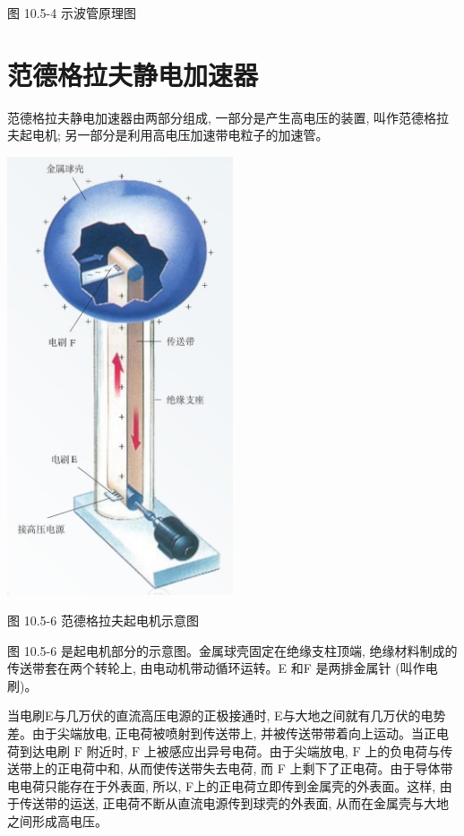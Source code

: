 \documentclass[10pt]{article}
\begin{document}
图 10.5-4 示波管原理图

\section*{范德格拉夫静电加速器}

范德格拉夫静电加速器由两部分组成, 一部分是产生高电压的装置, 叫作范德格拉夫起电机; 另一部分是利用高电压加速带电粒子的加速管。

\begin{center}
\includegraphics[max width=0.5\textwidth]{images/01911d5f-8e38-70c0-b5b8-2b399bd115b6_53_103313.jpg}
\end{center}

图 10.5-6 范德格拉夫起电机示意图

图 10.5-6 是起电机部分的示意图。金属球壳固定在绝缘支柱顶端, 绝缘材料制成的传送带套在两个转轮上, 由电动机带动循环运转。E 和F 是两排金属针 (叫作电刷)。

当电刷E与几万伏的直流高压电源的正极接通时, E与大地之间就有几万伏的电势差。由于尖端放电, 正电荷被喷射到传送带上, 并被传送带带着向上运动。当正电荷到达电刷 \(\mathrm{F}\) 附近时, \(\mathrm{F}\) 上被感应出异号电荷。由于尖端放电, \(\mathrm{F}\) 上的负电荷与传送带上的正电荷中和, 从而使传送带失去电荷, 而 F 上剩下了正电荷。由于导体带电电荷只能存在于外表面, 所以, F上的正电荷立即传到金属壳的外表面。这样, 由于传送带的运送, 正电荷不断从直流电源传到球壳的外表面, 从而在金属壳与大地之间形成高电压。
\end{document}
